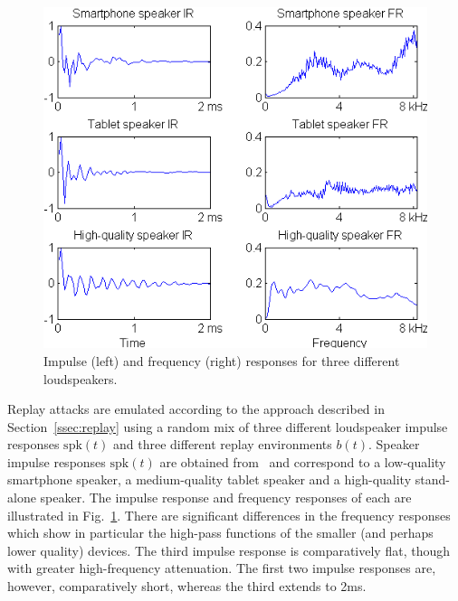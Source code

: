 
\begin{figure}
	\centering
	\includegraphics[width=1\linewidth]{Figs/IRs.png}
	\caption{Impulse (left) and frequency (right) responses for three different loudspeakers.}
	\label{fig::IRs}
\end{figure}

Replay attacks are emulated according to the approach described in Section~\ref{ssec:replay} 
using a random mix of three different loudspeaker impulse responses $\mathrm{spk}(t)$ and three different replay environments $b(t)$.  
Speaker impulse responses $\mathrm{spk}(t)$ are obtained from~\cite{Brown2014} and correspond to a low-quality smartphone speaker, a medium-quality tablet speaker and a high-quality stand-alone speaker.  The impulse response and frequency responses of each are illustrated in Fig.~\ref{fig::IRs}.  There are significant differences in the frequency responses which show in particular the high-pass functions of the smaller (and perhaps lower quality) devices.  The third impulse response is comparatively flat, though with greater high-frequency attenuation.  The first two impulse responses are, however, comparatively short, whereas the third extends to 2ms.  

